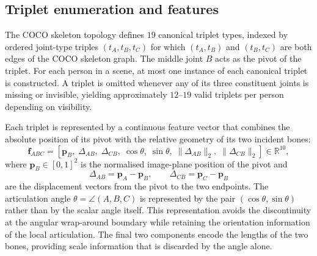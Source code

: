\subsection{Triplet enumeration and features}
\label{sec_meth_trigat_features}

The COCO skeleton topology defines $19$ canonical triplet types,
indexed by ordered joint-type triples $(t_A,t_B,t_C)$ for which
$(t_A,t_B)$ and $(t_B,t_C)$ are both edges of the COCO skeleton graph.
The middle joint $B$ acts as the pivot of the triplet.
For each person in a scene,
at most one instance of each canonical triplet is constructed.
A triplet is omitted whenever any of its three constituent joints
is missing or invisible,
yielding approximately $12$--$19$ valid triplets per person
depending on visibility.

Each triplet is represented by a continuous feature vector
that combines the absolute position of its pivot
with the relative geometry of its two incident bones:
\begin{equation}
    \mathbf{f}_{ABC}
    =
    \left[
        \mathbf{p}_B,\;
        \Delta_{AB},\;
        \Delta_{CB},\;
        \cos\theta,\;
        \sin\theta,\;
        \|\Delta_{AB}\|_2,\;
        \|\Delta_{CB}\|_2
    \right]
    \in \mathbb{R}^{10},
    \label{eq:trigat_features}
\end{equation}
where $\mathbf{p}_B\in[0,1]^2$ is the normalised image-plane position
of the pivot and
\begin{equation}
    \Delta_{AB}=\mathbf{p}_A-\mathbf{p}_B,
    \qquad
    \Delta_{CB}=\mathbf{p}_C-\mathbf{p}_B
\end{equation}
are the displacement vectors from the pivot to the two endpoints.
The articulation angle $\theta=\angle(A,B,C)$ is represented
by the pair $(\cos\theta,\sin\theta)$
rather than by the scalar angle itself.
This representation avoids the discontinuity at the angular
wrap-around boundary
while retaining the orientation information of the local articulation.
The final two components encode the lengths of the two bones,
providing scale information that is discarded by the angle alone.

